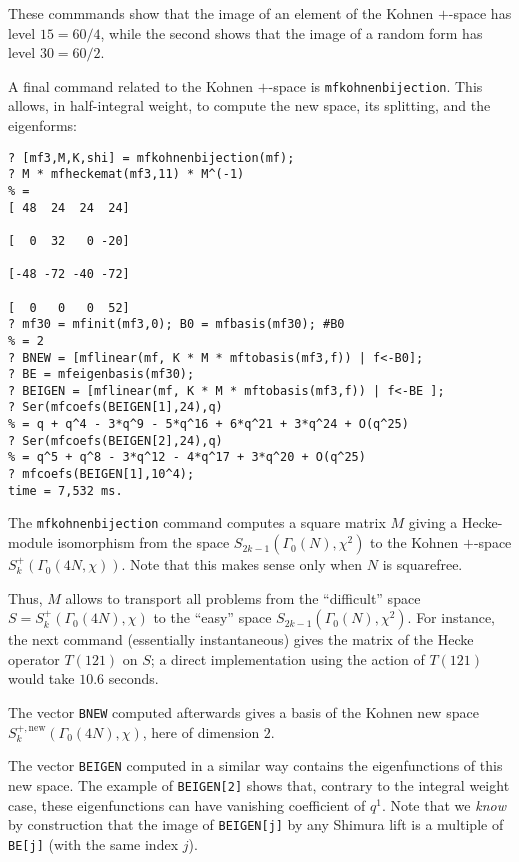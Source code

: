 \documentclass[11pt]{article}
\newcommand{\G}{\Gamma}
\def\kbd#1{{\tt #1}}
\begin{document}
These commmands show that the image of an element of the Kohnen $+$-space has
level $15=60/4$, while the second shows that the image of a random form has
level $30=60/2$.

\smallskip

A final command related to the Kohnen $+$-space is \kbd{mfkohnenbijection}.
This allows, in half-integral weight, to compute the new space, its
splitting, and the eigenforms:

\begin{verbatim}
? [mf3,M,K,shi] = mfkohnenbijection(mf);
? M * mfheckemat(mf3,11) * M^(-1)
% =
[ 48  24  24  24]

[  0  32   0 -20]

[-48 -72 -40 -72]

[  0   0   0  52]
? mf30 = mfinit(mf3,0); B0 = mfbasis(mf30); #B0
% = 2
? BNEW = [mflinear(mf, K * M * mftobasis(mf3,f)) | f<-B0];
? BE = mfeigenbasis(mf30);
? BEIGEN = [mflinear(mf, K * M * mftobasis(mf3,f)) | f<-BE ];
? Ser(mfcoefs(BEIGEN[1],24),q)
% = q + q^4 - 3*q^9 - 5*q^16 + 6*q^21 + 3*q^24 + O(q^25)
? Ser(mfcoefs(BEIGEN[2],24),q)
% = q^5 + q^8 - 3*q^12 - 4*q^17 + 3*q^20 + O(q^25)
? mfcoefs(BEIGEN[1],10^4);
time = 7,532 ms.
\end{verbatim}

The \kbd{mfkohnenbijection} command computes a square matrix $M$ giving
a Hecke-module isomorphism from the space $S_{2k-1}(\G_0(N),\chi^2)$ to the
Kohnen $+$-space $S_k^+(\G_0(4N,\chi))$. Note that this
makes sense only when $N$ is squarefree.

Thus, $M$ allows to transport all problems from the ``difficult'' space
$S=S_k^+(\G_0(4N),\chi)$ to the ``easy'' space $S_{2k-1}(\G_0(N),\chi^2)$.
For instance, the next command (essentially instantaneous) gives the matrix of
the Hecke operator $T(121)$ on $S$; a direct implementation using the action
of $T(121)$ would take $10.6$ seconds.

The vector \kbd{BNEW} computed afterwards gives a basis of the Kohnen new
space $S_k^{+,\text{new}}(\G_0(4N),\chi)$, here of dimension $2$.

The vector \kbd{BEIGEN} computed in a similar way contains the eigenfunctions
of this new space. The example of \kbd{BEIGEN[2]} shows that, contrary to
the integral weight case, these eigenfunctions can have vanishing coefficient
of $q^1$. Note that we \emph{know} by construction that the image of
\kbd{BEIGEN[j]} by any Shimura lift is a multiple of \kbd{BE[j]} (with the
same index $j$).
\smallskip
\end{document}
